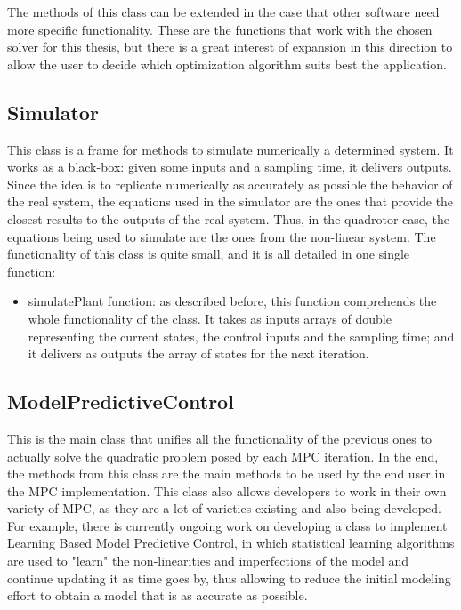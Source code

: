 The methods of this class can be extended in the case that other software need more specific functionality. These are the functions that work with the chosen solver for this thesis, but there is a great interest of expansion in this direction to allow the user to decide which optimization algorithm suits best the application.

\subsection{Simulator}

This class is a frame for methods to simulate numerically a determined system. It works as a black-box: given some inputs and a sampling time, it delivers outputs. Since the idea is to replicate numerically as accurately as possible the behavior of the real system, the equations used in the simulator are the ones that provide the closest results to the outputs of the real system. Thus, in the quadrotor case, the equations being used to simulate are the ones from the non-linear system. The functionality of this class is quite small, and it is all detailed in one single function:

\begin{itemize}

\item simulatePlant function: as described before, this function comprehends the whole functionality of the class. It takes as inputs arrays of double representing the current states, the control inputs and the sampling time; and it delivers as outputs the array of states for the next iteration. 

\end{itemize}

\subsection{ModelPredictiveControl}

This is the main class that unifies all the functionality of the previous ones to actually solve the quadratic problem posed by each MPC iteration. In the end, the methods from this class are the main methods to be used by the end user in the MPC implementation. This class also allows developers to work in their own variety of MPC, as they are a lot of varieties existing and also being developed. For example, there is currently ongoing work on developing a class to implement Learning Based Model Predictive Control, in which statistical learning algorithms are used to "learn" the non-linearities and imperfections of the model and continue updating it as time goes by, thus allowing to reduce the initial modeling effort to obtain a model that is as accurate as possible. \\

